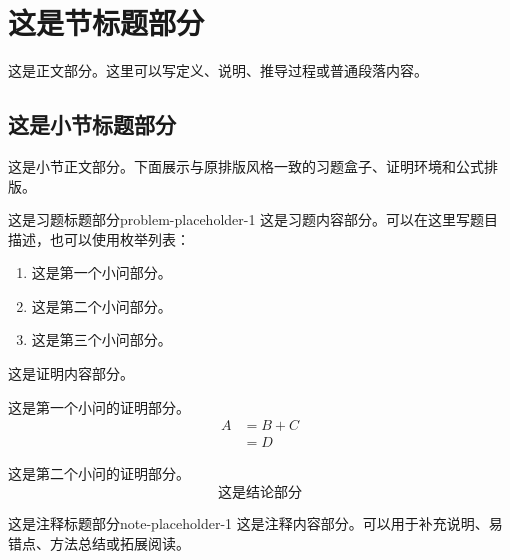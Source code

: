 \section{这是节标题部分}

这是正文部分。这里可以写定义、说明、推导过程或普通段落内容。

\subsection{这是小节标题部分}

这是小节正文部分。下面展示与原排版风格一致的习题盒子、证明环境和公式排版。

\begin{problem}{这是习题标题部分}{problem-placeholder-1}
    这是习题内容部分。可以在这里写题目描述，也可以使用枚举列表：
    \begin{enumerate}
        \item 这是第一个小问部分。
        \item 这是第二个小问部分。
        \item 这是第三个小问部分。
    \end{enumerate}
\end{problem}

\begin{myproof}
    这是证明内容部分。

    这是第一个小问的证明部分。
    \begin{equation}
        \begin{aligned}
            A & = B + C \\
              & = D
        \end{aligned}
    \end{equation}

    这是第二个小问的证明部分。
    \begin{equation}
        \boxed{\text{这是结论部分}}
    \end{equation}
\end{myproof}

\begin{note}{这是注释标题部分}{note-placeholder-1}
    这是注释内容部分。可以用于补充说明、易错点、方法总结或拓展阅读。
\end{note}

\endinput

